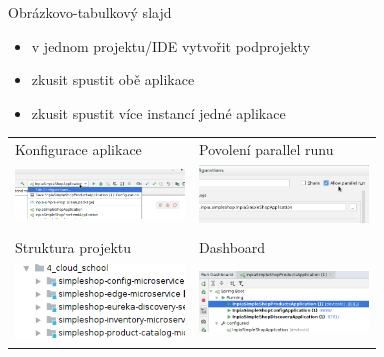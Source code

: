 \documentclass{beamer}
\begin{document}
\begin{frame}[fragile, shrink=0]{Obrázkovo-tabulkový slajd}
	\begin{itemize}
		\item v jednom projektu/IDE vytvořit podprojekty
		\item zkusit spustit obě aplikace
		\item zkusit spustit více instancí jedné aplikace

	\end{itemize}

	\begin{tabular}{ll}
		\\
		Konfigurace aplikace                                             & Povolení parallel runu                                                        \\
		\includegraphics[width=4.5cm]{images/idea-app-configuration.png} & \includegraphics[width=4.5cm]{images/idea-app-configuration-parallel-run.png} \\
		\\
		Struktura projektu                                               & Dashboard                                                                     \\
		\includegraphics[width=4.5cm]{images/idea-project-structure.png} & \includegraphics[width=4.5cm]{images/idea-spring-boot-dashboard.png}          \\
	\end{tabular}
\end{frame}
\end{document}
